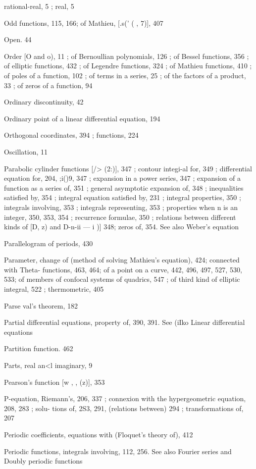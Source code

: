 rational-real, 5 ; real, 5

Odd functions, 115, 166; of Mathieu, [.s(' ( , 7)], 407

Open. 44

Order [O and o), 11 ; of Bernoullian polynomials, 126 ; of Bessel functions, 356 ; of elliptic
functions, 432 ; of Legendre functions, 324 ; of Mathieu functions, 410 ; of poles of a
function, 102 ; of terms in a series, 25 ; of the factors of a product, 33 ; of zeros of a
function, 94

Ordinary discontinuity, 42

Ordinary point of a linear differential equation, 194

Orthogonal coordinates, 394 ; functions, 224

Oscillation, 11

Parabolic cylinder functions [/>  (2:)], 347 ; contour integi-al for, 349 ; differential equation for,
204, ;i()9, 347 ; expansion in a power series, 347 ; expansion of a function as a series of, 351 ;
general asymptotic expansion of, 348 ; inequalities satisfied by, 354 ; integral equation
satisfied by, 231 ; integral properties, 350 ; integrals involving, 353 ; integrals representing,
353 ; properties when n is an integer, 350, 353, 354 ; recurrence formulae, 350 ; relations
between different kinds of [D,  z) and D-n-ii — i )]  348; zeros of, 354. See also Weber's
equation

Parallelogram of periods, 430

Parameter, change of (method of solving Mathieu's equation), 424; connected with Theta-
functions, 463, 464; of a point on a curve, 442, 496, 497, 527, 530, 533; of members of
confocal systems of quadrics, 547 ; of third kind of elliptic integral, 522 ; thermometric, 405

Parse val's theorem, 182

Partial differential equations, property of, 390, 391. See (iIko Linear differential equations

Partition function. 462

Parts, real an<l imaginary, 9

Pearson's function [w ,  , (z)], 353

P-equation, Riemann's, 206, 337 ; connexion with the hypergeometric equation, 208, 283 ; solu-
tions of, 2S3, 291, (relations between) 294 ; transformations of, 207

Periodic coefficients, equations with (Floquet's theory of), 412

Periodic functions, integrals involving, 112, 256. See also Fourier series and Doubly periodic
functions


